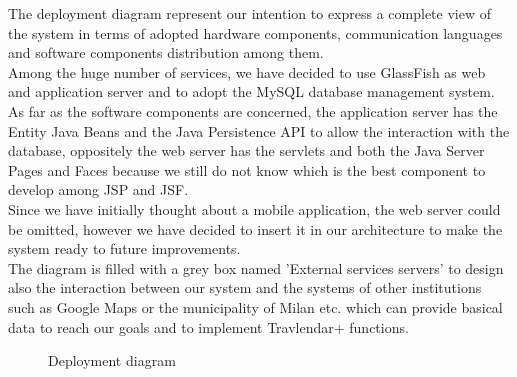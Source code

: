 The deployment diagram represent our intention to express a complete view of the system in terms of adopted hardware components, communication languages and  software components distribution among them. \\
Among the huge number of services, we have decided to use GlassFish as web and application server and to adopt the MySQL database management system. \\
As far as the software components are concerned, the application server has the Entity Java Beans and the Java Persistence API to allow the interaction with the database, oppositely the web server has the servlets and both the Java Server Pages and Faces because we still do not know which is the best component to develop among JSP and JSF.\\
Since we have initially thought about a mobile application, the web server could be omitted, however we have decided to insert it in our architecture to make the system ready to future improvements. \\ 
The diagram is filled with a grey box named 'External services servers' to design also the interaction between our system and the systems of other institutions such as Google Maps or the municipality of Milan etc. which can provide basical data to reach our goals and to implement Travlendar+ functions.\\


\begin{figure} 
\begin{center}

\caption{Deployment diagram} 
\label{fig:deploymentdiagram} 


\end{center}
\end{figure} 
